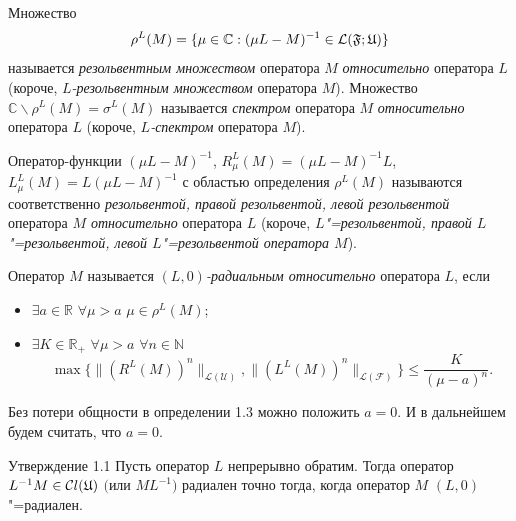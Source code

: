 \smallskip

\begin{definition}[1.1]Множество $$\rho^{L}(M)=\{\mu\in\mathbb{C}:(\mu L-M)^{-1}\in\mathcal L
(\frak F;\frak U)\}$$ называется \emph{резольвентным множеством} оператора $M$ \emph{относительно} оператора $L$ (короче, \emph{$L$-резольвентным множеством} оператора $M$). 
Множество $\mathbb{C}\backslash \rho^{L}(M)=\sigma^{L}(M)$ называется \emph{спектром} оператора $M$ \emph{относительно} оператора $L$ (короче, \emph{$L$-спектром} оператора $M$).
\end{definition}

\smallskip

\begin{definition}[1.2]Оператор-функции $(\mu L-M)^{-1}$,
$R^{L}_{\mu}(M)=(\mu L-M)^{-1}L$, $L^{L}_{\mu}(M)=L(\mu L-M)^{-1}$  с областью определения $\rho^{L}(M)$ называются
соответственно \emph{резольвентой, правой резольвентой, левой
резольвентой} оператора \emph{$M$ относительно} оператора $L$
(короче, \emph{$L$"=резольвентой, правой  $L$"=резольвентой, левой
$L$"=резольвентой оператора $M$}).
\end{definition}

\smallskip

\begin{definition}[1.3]Оператор $M$ называется \emph{$(L, 0)$-радиальным относительно} оператора $L$, если
\begin{itemize}
\item[(i)] $\exists a\in\mathbb{R}$ $\forall\mu>a$ $\mu\in\rho^{L}(M)$;
\item[(ii)] $\exists K\in \mathbb{R}_{+}$ $\forall\mu>a$ $\forall n\in\mathbb{N}$
$$\max\bigl\{ \| (R^{L}(M))^{n} \|  _{\mathcal{L}(\mathcal{U})},
 \| (L^{L}(M))^{n} \|  _{\mathcal{L}(\mathcal{F})}\bigr\}\leq
\frac{K}{ (\mu -a)^{n}}.$$
\end{itemize}
\end{definition}

\smallskip

\begin{remark}[1.1] Без потери общности в определении 1.3 можно
положить \mbox{$a=0$.}  И в дальнейшем будем считать, что $a=0$.
 \end{remark}

\smallskip

\begin{newthm}{Утверждение 1.1} Пусть оператор $L$ непрерывно обратим{\rm .} 
Тогда оператор $L^{-1}M\in\mathcal Cl(\frak{U})$ $($или $ML^{-1})$ радиален точно тогда{\rm ,} когда оператор $M$
$(L, 0)$"=радиален{\rm .}
\end{newthm}

